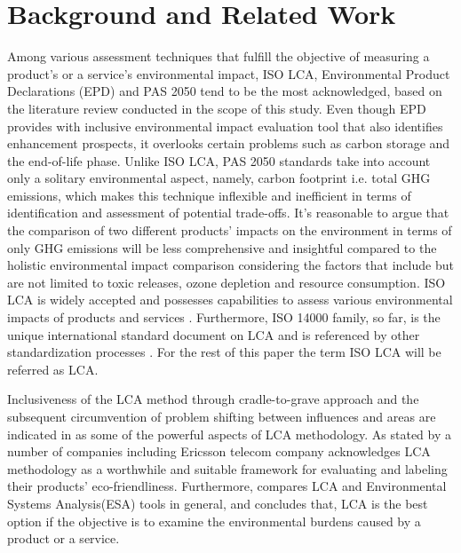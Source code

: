 \documentclass[conference]{IEEEtran}
\begin{document}
\section{Background and Related Work} 

Among various assessment techniques that fulfill the objective of measuring a product's or a service's environmental impact, ISO LCA\cite{ISO140402006}, Environmental Product Declarations (EPD)\cite{iso2006environmental} and PAS 2050 \cite{pas20082050} tend to be the most acknowledged, based on the literature review conducted in the scope of this study. Even though EPD provides with inclusive environmental impact evaluation tool that also identifies enhancement prospects, it overlooks certain problems such as carbon storage and the end-of-life phase. Unlike ISO LCA, PAS 2050 standards take into account only a solitary environmental aspect, namely, carbon footprint i.e. total GHG emissions, which makes this technique inflexible and inefficient in terms of identification and assessment of potential trade-offs.
It's reasonable to argue that the comparison of two different products' impacts on the environment in terms of only GHG emissions will be less comprehensive and insightful compared to the holistic environmental impact comparison considering the factors that include but are not limited to toxic releases, ozone depletion and resource consumption. ISO LCA is widely accepted and  possesses capabilities to assess various environmental impacts of products and services \cite{cooper2006life}. Furthermore,  ISO 14000 family, so far, is the unique international standard document on LCA and is referenced by other standardization processes \cite{finkbeiner201340s}. For the rest of this paper the term ISO LCA will be referred as LCA.

Inclusiveness of the LCA method through cradle-to-grave approach and the subsequent circumvention of problem shifting between influences and areas are indicated in \cite{hermann2007assessing} as some of the powerful aspects of LCA methodology. As stated by \cite{guldbrandsson2012opportunities} a number of companies including Ericsson telecom company acknowledges LCA methodology as a worthwhile and suitable framework for evaluating and labeling their products' eco-friendliness. Furthermore, \cite{finnveden2000limitations} compares LCA and Environmental Systems Analysis(ESA) tools in general, and concludes that, LCA is the best option if the objective is to examine the environmental burdens caused by a product or a service.
\end{document}
